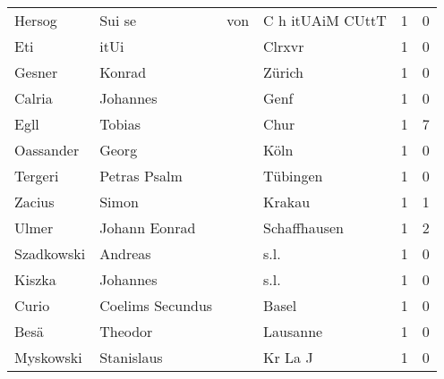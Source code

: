 \begin{center}
\begin{tiny}
\begin{longtabu}{llllrr}
                   Hersog &                             Sui se &         von &                            C h itUAiM CUttT &          1 &         0 \\
                      Eti &                               itUi &             &                                      Clrxvr &          1 &         0 \\
                   Gesner &                             Konrad &             &                                      Zürich &          1 &         0 \\
                   Calria &                           Johannes &             &                                        Genf &          1 &         0 \\
                     Egll &                             Tobias &             &                                        Chur &          1 &         7 \\
                Oassander &                              Georg &             &                                        Köln &          1 &         0 \\
                  Tergeri &                       Petras Psalm &             &                                    Tübingen &          1 &         0 \\
                   Zacius &                              Simon &             &                                      Krakau &          1 &         1 \\
                    Ulmer &                      Johann Eonrad &             &                                Schaffhausen &          1 &         2 \\
               Szadkowski &                            Andreas &             &                                        s.l. &          1 &         0 \\
                   Kiszka &                           Johannes &             &                                        s.l. &          1 &         0 \\
                    Curio &                   Coelims Secundus &             &                                       Basel &          1 &         0 \\
                     Besä &                            Theodor &             &                                    Lausanne &          1 &         0 \\
                Myskowski &                         Stanislaus &             &                                     Kr La J &          1 &         0 \\

\end{longtabu}
\end{tiny}
\end{center}
